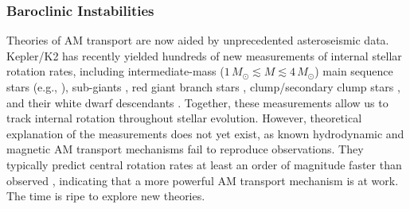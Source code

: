 \subsubsection{Baroclinic Instabilities}
\label{baroclinic}


Theories of AM transport are now aided by unprecedented asteroseismic data. Kepler/K2 has recently yielded hundreds of new measurements of internal stellar rotation rates, including intermediate-mass ($1 \, M_\odot \! \lesssim \! M \! \lesssim \! 4 \, M_\odot$) main sequence stars (e.g., \citealt{benomar:15,vanreeth:16}), sub-giants \citep{deheuvels:14}, red giant branch stars \citep{beck:12,mosser:12}, clump/secondary clump stars \citep{mosser:12,deheuvels:15}, and their white dwarf descendants \citep{hermes:17}. Together, these measurements allow us to track internal rotation throughout stellar evolution. However, theoretical explanation of the measurements does not yet exist, as known hydrodynamic and magnetic AM transport mechanisms fail to reproduce observations. They typically predict central rotation rates at least an order of magnitude faster than observed \citep{cantiello:14}, indicating that a more powerful AM transport mechanism is at work. The time is ripe to explore new theories.

